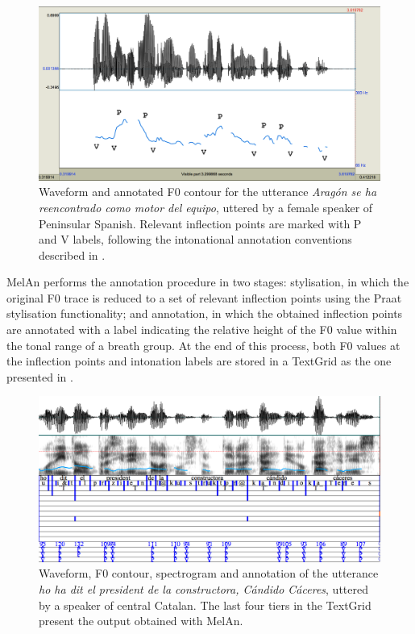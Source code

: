 \documentclass[output=paper]{langsci/langscibook}
\begin{document}
\begin{figure}
\includegraphics[width=\textwidth]{figures/GAR-img003.png}
\caption{Waveform and annotated F0 contour for the utterance \textit{Aragón se ha reencontrado como motor del equipo}, uttered by a female speaker of Peninsular Spanish. Relevant inflection points are marked with P and V labels, following the intonational annotation conventions described in \citet{Garrido1996,Garrido2001}.}
\label{fig:gar:3}
\end{figure}

MelAn performs the annotation procedure in two stages: stylisation, in which the original F0 trace is reduced to a set of relevant inflection points using the Praat stylisation functionality; and annotation, in which the obtained inflection points are annotated with a label indicating the relative height of the F0 value within the tonal range of a breath group. At the end of this process, both F0 values at the inflection points and intonation labels are stored in a TextGrid as the one presented in .

  
\begin{figure}
\includegraphics[width=\textwidth]{figures/GAR-img004.png}
\caption{Waveform, F0 contour, spectrogram and annotation of the utterance \textit{ho ha dit el president de la constructora, Cándido Cáceres}, uttered by a speaker of central Catalan. The last four tiers in the TextGrid present the output obtained with MelAn.}
\label{fig:gar:4}
\end{figure}
 
\end{document}
